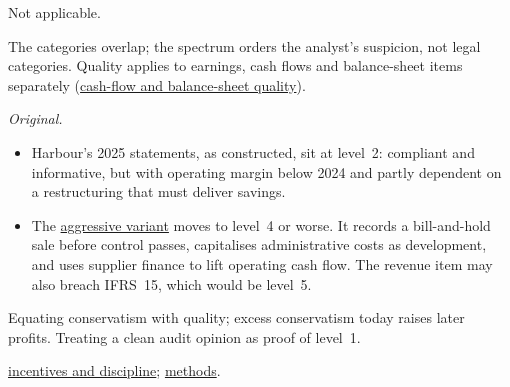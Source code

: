 \begin{qfdefinition}
 Not applicable.

 The categories overlap; the spectrum orders the analyst's suspicion, not legal categories. Quality applies to earnings, cash flows and balance-sheet items separately (\hyperref[meth:cash-flow-balance-sheet-quality]{cash-flow and balance-sheet quality}).

 \emph{Original.}
\begin{itemize}
\item Harbour's 2025 statements, as constructed, sit at level~2: compliant and informative, but with operating margin below 2024 and partly dependent on a restructuring that must deliver savings.
\item The \hyperref[meth:report-quality-evaluation]{aggressive variant} moves to level~4 or worse. It records a bill-and-hold sale before control passes, capitalises administrative costs as development, and uses supplier finance to lift operating cash flow. The revenue item may also breach IFRS~15, which would be level~5.
\end{itemize}

 Equating conservatism with quality; excess conservatism today raises later profits. Treating a clean audit opinion as proof of level~1.

 \hyperref[def:reporting-incentives-discipline]{incentives and discipline}; \hyperref[meth:earnings-management-presentation]{methods}.

\end{qfdefinition}

